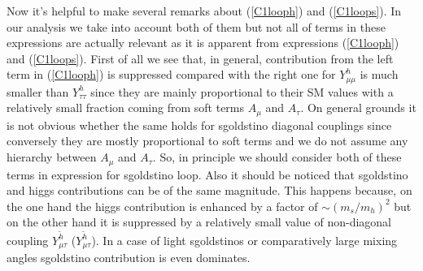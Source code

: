 \documentclass[10pt]{article}
\begin{document}
Now it's helpful to make several remarks about (\ref{C1looph}) and (\ref{C1loops}). In our analysis we take into account both of them but not all of terms in these expressions are actually relevant as it is apparent from expressions (\ref{C1looph}) and (\ref{C1loops}). First of all we see that, in general, contribution from the left term in (\ref{C1looph}) is suppressed compared with the right one for $Y_{\mu \mu}^{h}$ is much smaller than $Y_{\tau \tau}^{h}$ since they are mainly proportional to their SM values with a relatively small fraction coming from soft terms $A_{\mu}$ and $A_{\tau}$. On general grounds it is not obvious whether the same holds for sgoldstino diagonal couplings since conversely they are mostly proportional to soft terms and we do not assume any hierarchy between $A_{\mu}$ and $A_{\tau}$. So, in principle we should consider both of these terms in expression for sgoldstino loop. Also it should be noticed that sgoldstino and higgs contributions can be of the same magnitude. This happens because, on the one hand the higgs contribution is enhanced by a factor of $\sim \left(m_s/m_h\right)^2$ but on the other hand it is suppressed by a relatively small value of non-diagonal coupling $Y_{\mu \tau}^{\tilde{h}}$ ($Y_{\mu \tau}^{\tilde{h}}$). In a case of light sgoldstinos or comparatively large mixing angles sgoldstino contribution is even dominates.
\end{document}
